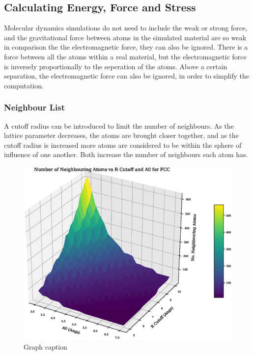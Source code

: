 \subsection{Calculating Energy, Force and Stress}

Molecular dynamics simulations do not need to include the weak or strong force, and the gravitational force between atoms in the simulated material are so weak in comparison the the electromagnetic force, they can also be ignored.  There is a force between all the atoms within a real material, but the electromagnetic force is inversely proportionally to the seperation of the atoms.  Above a certain separation, the electromagnetic force can also be ignored, in order to simplify the computation.

\subsubsection{Neighbour List}

A cutoff radius can be introduced to limit the number of neighbours.  As the lattice parameter decreases, the atoms are brought closer together, and as the cutoff radius is increased more atoms are considered to be within the sphere of influence of one another.  Both increase the number of neighbours each atom has.

\begin{figure}[!htbp]
  \begin{center}
    \includegraphics[scale=0.40]{chapters/background_potential_fitting/plots/atom_neighbours.eps}
    \caption{Graph caption}
    \label{graph:graph1}
  \end{center}
\end{figure}

